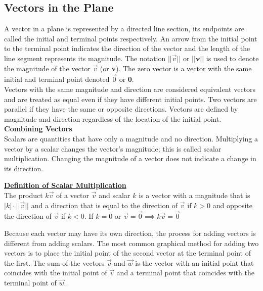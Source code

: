 \documentclass[a4paper]{article}
\let\bf\textbf
\begin{document}
\subsection{Vectors in the Plane}
A vector in a plane is represented by a directed line section, its endpoints are called the initial and terminal points respectively. An arrow from the initial point to the terminal point indicates the direction of the vector and the length of the line segment represents its magnitude. The notation $||\vec{v}||$ or $||\bf{v}||$ is used to denote the magnitude of the vector $\vec{v}$ (or \bf{v}). The zero vector is a vector with the same initial and terminal point denoted $\vec{0}$ or \bf{0}. 
\vspace{1mm}\\
Vectors with the same magnitude and direction are considered equivalent vectors and are treated as equal even if they have different initial points. Two vectors are parallel if they have the same or opposite directions. Vectors are defined by magnitude and direction regardless of the location of the initial point.
\vspace{2mm}\\
\bf{Combining Vectors}\vspace{2mm}\\
Scalars are quantities that have only a magnitude and no direction. Multiplying a vector by a scalar changes the vector's magnitude; this is called scalar multiplication. Changing the magnitude of a vector does not indicate a change in its direction.
\begin{shaded}
    \noindent\underline{\bf{Definition of Scalar Multiplication}}\vspace{2mm}\\
    The product $k\vec{v}$ of a vector $\vec{v}$ and scalar $k$ is a vector with a magnitude that is $|k| \cdot ||\vec{v}||$ and a direction that is equal to the direction of $\vec{v}$ if $k>0$ and opposite the direction of $\vec{v}$ if $k<0$. If $k = 0$ or $\vec{v} = \vec{0} \implies k\vec{v} = \vec{0}$
\end{shaded}
\noindent Because each vector may have its own direction, the process for adding vectors is different from adding scalars. The most common graphical method for adding two vectors is to place the initial point of the second vector at the terminal point of the first. The sum of the vectors $\vec{v}$ and $\vec{w}$ is the vector with an initial point that coincides with the initial point of $\vec{v}$ and a terminal point that coincides with the terminal point of $\vec{w}$.
\end{document}
